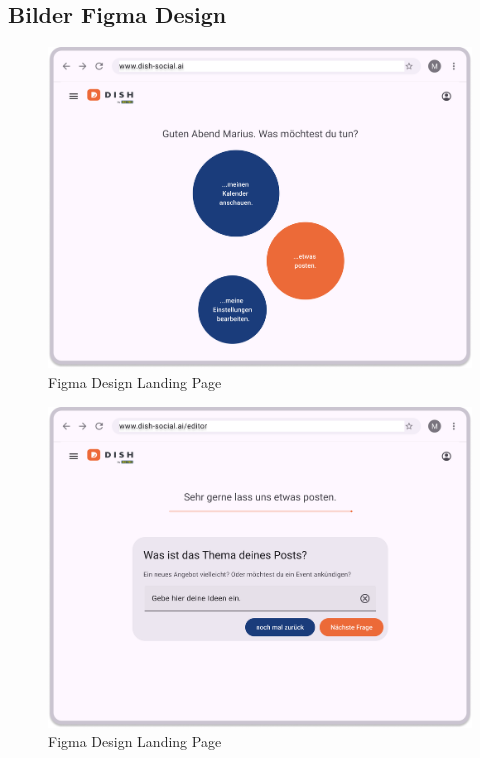 \subsection{Bilder Figma Design}\label{subsec:bilder-figma-design}
\begin{figure}[htbp]
    \centering
    \includegraphics[width=\textwidth]{abbildungen/figma/Landing Page}
    \caption{Figma Design Landing Page}
    \label{fig:landing-page}
\end{figure}
\newpage

\begin{figure}[htbp]
    \centering
    \includegraphics[width=\textwidth]{abbildungen/figma/Dialog}
    \caption{Figma Design Landing Page}
    \label{fig:dialog-page}
\end{figure}
\newpage

